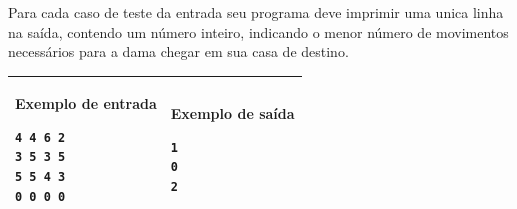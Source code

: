 Para cada caso de teste da entrada seu programa deve imprimir uma unica linha na
saída, contendo um número inteiro, indicando o menor número de movimentos
necessários para a dama chegar em sua casa de destino.

\begin{table}[!h]
\centering
\begin{tabular}{|l|l|}
\hline
\begin{minipage}[t]{3in}
\textbf{Exemplo de entrada}
\begin{verbatim}
4 4 6 2
3 5 3 5
5 5 4 3
0 0 0 0
\end{verbatim}
\vspace{1mm}
\end{minipage}
&

\begin{minipage}[t]{3in}
\textbf{Exemplo de saída}
\begin{verbatim}
1
0
2
\end{verbatim}
\vspace{1mm}
\end{minipage} \\
\hline
\end{tabular}
\end{table}

\newpage
